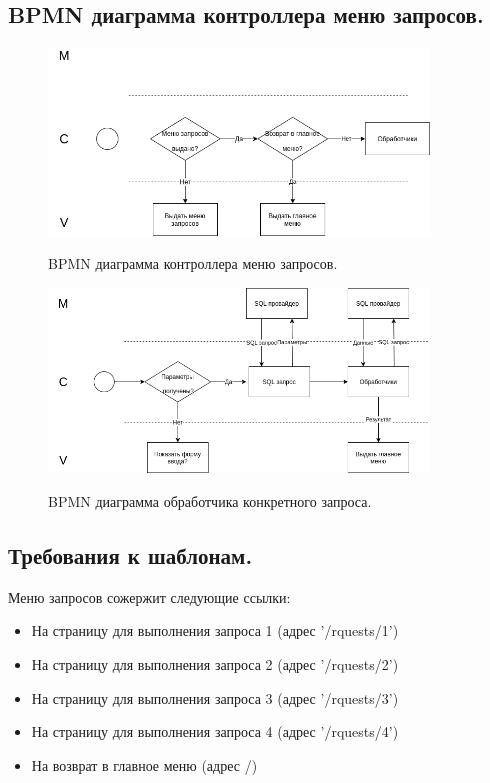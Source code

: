 \documentclass[12pt, a4paper]{article}
\begin{document}
   \subsection{BPMN диаграмма контроллера меню запросов.}
   \begin{figure}[h]
   	\centering    %
   	\includegraphics[width=0.9\textwidth]{pictures/Requests_Controller.png}
   	\label{fig:pic4} %
   	\caption{BPMN диаграмма контроллера меню запросов.}
   \end{figure}

    \begin{figure}[h]
    	\centering    %
    	\includegraphics[width=0.9\textwidth]{pictures/Handler_BPMN.png}
    	\label{fig:pic5} %
    	\caption{BPMN диаграмма обработчика конкретного запроса.}
    \end{figure}
    
    \subsection{Требования к шаблонам.}
    Меню запросов сожержит следующие ссылки:
    \begin{itemize}
    	\item На страницу для выполнения запроса 1 (адрес '/rquests/1')
    	\item На страницу для выполнения запроса 2 (адрес '/rquests/2')
    	\item На страницу для выполнения запроса 3 (адрес '/rquests/3')
    	\item На страницу для выполнения запроса 4 (адрес '/rquests/4')
    	\item На возврат в главное меню (адрес /)
    \end{itemize}
\end{document}
